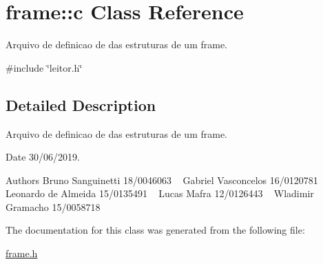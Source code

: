\hypertarget{classframe_1_1c}{}\section{frame\+::c Class Reference}
\label{classframe_1_1c}


Arquivo de definicao de das estruturas de um frame.  




{\ttfamily \#include \char`\"{}leitor.\+h\char`\"{}}



\subsection{Detailed Description}
Arquivo de definicao de das estruturas de um frame. 

\begin{DoxyDate}{Date}
30/06/2019.
\end{DoxyDate}
\begin{DoxyAuthor}{Authors}
Bruno Sanguinetti 18/0046063 ~\newline
Gabriel Vasconcelos 16/0120781 ~\newline
Leonardo de Almeida 15/0135491 ~\newline
Lucas Mafra 12/0126443 ~\newline
Wladimir Gramacho 15/0058718 ~\newline

\end{DoxyAuthor}


The documentation for this class was generated from the following file\+:\begin{DoxyCompactItemize}
\item 
\mbox{\hyperlink{frame_8h}{frame.\+h}}\end{DoxyCompactItemize}
